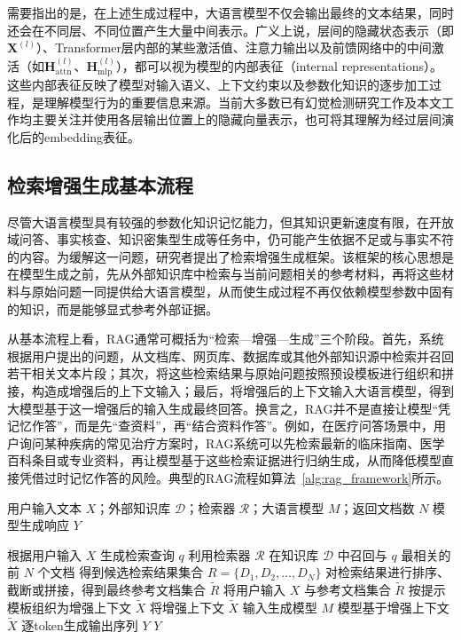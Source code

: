 需要指出的是，在上述生成过程中，大语言模型不仅会输出最终的文本结果，同时还会在不同层、不同位置产生大量中间表示。广义上说，层间的隐藏状态表示（即$\mathbf{X}^{(l)}$）、Transformer层内部的某些激活值、注意力输出以及前馈网络中的中间激活（如$\mathbf{H}^{(l)}_{\mathrm{attn}}$、$\mathbf{H}^{(l)}_{\mathrm{mlp}}$），都可以视为模型的内部表征（internal representations）。这些内部表征反映了模型对输入语义、上下文约束以及参数化知识的逐步加工过程，是理解模型行为的重要信息来源。当前大多数已有幻觉检测研究工作及本文工作均主要关注并使用各层输出位置上的隐藏向量表示，也可将其理解为经过层间演化后的embedding表征。

\subsection{检索增强生成基本流程}

尽管大语言模型具有较强的参数化知识记忆能力，但其知识更新速度有限，在开放域问答、事实核查、知识密集型生成等任务中，仍可能产生依据不足或与事实不符的内容。为缓解这一问题，研究者提出了检索增强生成框架\cite{gao2024retrieval,huang2024survey,wu2025retrieval}。该框架的核心思想是在模型生成之前，先从外部知识库中检索与当前问题相关的参考材料，再将这些材料与原始问题一同提供给大语言模型，从而使生成过程不再仅依赖模型参数中固有的知识，而是能够显式参考外部证据。

从基本流程上看，RAG通常可概括为“检索—增强—生成”三个阶段。首先，系统根据用户提出的问题，从文档库、网页库、数据库或其他外部知识源中检索并召回若干相关文本片段；其次，将这些检索结果与原始问题按照预设模板进行组织和拼接，构造成增强后的上下文输入；最后，将增强后的上下文输入大语言模型，得到大模型基于这一增强后的输入生成最终回答。换言之，RAG并不是直接让模型“凭记忆作答”，而是先“查资料”，再“结合资料作答”\cite{lewis2020retrieval,borgeaud2022improving,lazaridou2022internet}。例如，在医疗问答场景中，用户询问某种疾病的常见治疗方案时，RAG系统可以先检索最新的临床指南、医学百科条目或专业资料，再让模型基于这些检索证据进行归纳生成，从而降低模型直接凭借过时记忆作答的风险。典型的RAG流程如算法~\ref{alg:rag_framework}所示。

\begin{algorithm}[htbp]
\caption{检索增强生成基本流程}
\label{alg:rag_framework}
\begin{algorithmic}[1]
\Require 用户输入文本 $X$；外部知识库 $\mathcal{D}$；检索器 $\mathcal{R}$；大语言模型 $M$；返回文档数 $N$
\Ensure 模型生成响应 $Y$

\State 根据用户输入 $X$ 生成检索查询 $q$
\State 利用检索器 $\mathcal{R}$ 在知识库 $\mathcal{D}$ 中召回与 $q$ 最相关的前 $N$ 个文档
\State 得到候选检索结果集合 $R=\{D_1,D_2,\ldots,D_N\}$
\State 对检索结果进行排序、截断或拼接，得到最终参考文档集合 $\widetilde{R}$
\State 将用户输入 $X$ 与参考文档集合 $\widetilde{R}$ 按提示模板组织为增强上下文 $\widetilde{X}$
\State 将增强上下文 $\widetilde{X}$ 输入生成模型 $M$
\State 模型基于增强上下文 $\widetilde{X}$ 逐token生成输出序列 $Y$
\State \Return $Y$

\end{algorithmic}
\end{algorithm}

